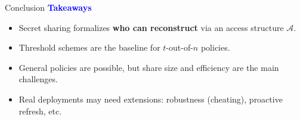 \begin{frame}{Conclusion \cite{beimel2011secret}}
	\textbf{\textcolor{blue}{Takeaways}}
	\begin{itemize}
		\item Secret sharing formalizes \textbf{who can reconstruct} via an access structure \(\mathcal{A}\).
		\item Threshold schemes are the baseline for \(t\)-out-of-\(n\) policies.
		\item General policies are possible, but share size and efficiency are the main challenges.
		\item Real deployments may need extensions: robustness (cheating), proactive refresh, etc.
	\end{itemize}
\end{frame}

